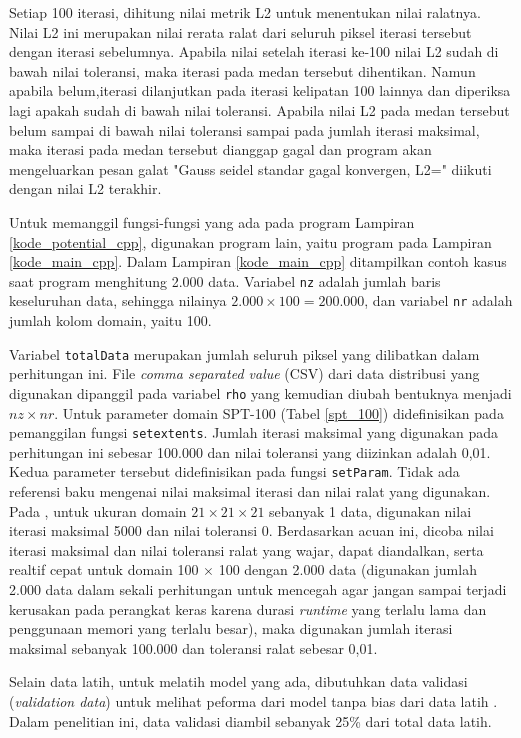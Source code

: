 Setiap 100 iterasi, dihitung nilai metrik L2 untuk menentukan nilai ralatnya. Nilai
L2 ini merupakan nilai rerata ralat dari seluruh piksel iterasi tersebut dengan iterasi
sebelumnya. Apabila nilai setelah iterasi ke-100 nilai L2 sudah di bawah nilai
toleransi, maka iterasi pada medan tersebut dihentikan. Namun apabila belum,iterasi
dilanjutkan pada iterasi kelipatan 100 lainnya dan diperiksa lagi apakah sudah
di bawah nilai toleransi. Apabila nilai L2 pada medan tersebut belum sampai di bawah
nilai toleransi sampai pada jumlah iterasi maksimal, maka iterasi pada medan
tersebut dianggap gagal dan program akan mengeluarkan pesan galat "Gauss seidel standar
gagal konvergen, L2=" diikuti dengan nilai L2 terakhir.

Untuk memanggil fungsi-fungsi yang ada pada program Lampiran
\ref{kode_potential_cpp}, digunakan program lain, yaitu program pada Lampiran
\ref{kode_main_cpp}. Dalam Lampiran \ref{kode_main_cpp} ditampilkan contoh kasus
saat program menghitung 2.000 data. Variabel \texttt{nz} adalah jumlah baris keseluruhan
data, sehingga nilainya $2.000 \times 100 = 200.000$, dan variabel \texttt{nr}
adalah jumlah kolom domain, yaitu 100.

Variabel \texttt{totalData} merupakan jumlah seluruh piksel yang dilibatkan dalam
perhitungan ini. File \textit{comma separated value} (CSV) dari data distribusi yang
digunakan dipanggil pada variabel \texttt{rho} yang kemudian diubah bentuknya
menjadi $nz \times nr$. Untuk parameter domain SPT-100 (Tabel \ref{spt_100}) didefinisikan
pada pemanggilan fungsi \texttt{setextents}. Jumlah iterasi maksimal yang digunakan
pada perhitungan ini sebesar 100.000 dan nilai toleransi yang diizinkan adalah 0,01.
Kedua parameter tersebut didefinisikan pada fungsi \texttt{setParam}. Tidak ada referensi
baku mengenai nilai maksimal iterasi dan nilai ralat yang digunakan. Pada
\cite{lubos_brieda_2019}, untuk ukuran domain $21 \times 21 \times 21$ sebanyak 1
data, digunakan nilai iterasi maksimal 5000 dan nilai toleransi 0. Berdasarkan
acuan ini, dicoba nilai iterasi maksimal dan nilai toleransi ralat yang wajar,
dapat diandalkan, serta realtif cepat untuk domain 100 $\times$ 100 dengan 2.000
data (digunakan jumlah 2.000 data dalam sekali perhitungan untuk mencegah agar
jangan sampai terjadi kerusakan pada perangkat keras karena durasi \textit{runtime}
yang terlalu lama dan penggunaan memori yang terlalu besar), maka digunakan jumlah
iterasi maksimal sebanyak 100.000 dan toleransi ralat sebesar 0,01.

Selain data latih, untuk melatih model yang ada, dibutuhkan data validasi (\emph{validation
data}) untuk melihat peforma dari model tanpa bias dari data latih \citep{jason_brownlee_2017}.
Dalam penelitian ini, data validasi diambil sebanyak 25\% dari total data latih.

